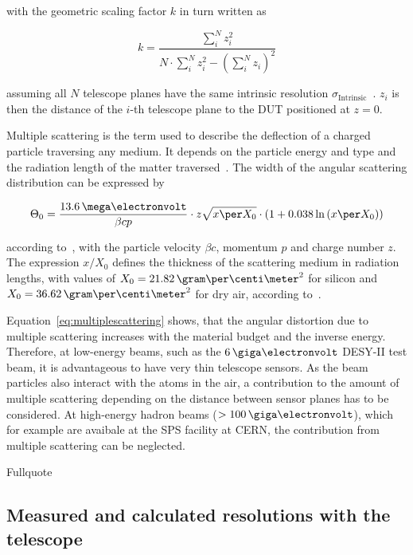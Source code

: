 with the geometric scaling factor $k$ in turn written as

\begin{equation}
k = \frac{\sum_i^N z_i^2}{N \cdot \sum_i^N z_i^2 - \left( \sum_i^N z_i
\right)^2}
\end{equation}

assuming all $N$ telescope planes have the same intrinsic resolution
$\sigma_{\textrm{Intrinsic}}$~\cite{ref:eudetreport200902}. 
$z_i$ is then the distance of the $i$-th telescope plane to the DUT positioned at $z=0$.

Multiple scattering is the term used to describe the deflection of a charged particle traversing any medium. 
It depends on the particle energy and type
and the radiation length of the matter traversed~\cite{ref:scatteringhighland}.
The width of the angular scattering distribution can be expressed by

\begin{equation}
\label{eq:multiplescattering}
\Theta_{0} = \frac{13.6\,\mega\electronvolt}{\beta c p} \cdot z
\sqrt{x \per X_0}
\cdot \left( 1 + 0.038 \ln{\left( x \per X_0\right) } \right)
\end{equation}

according to~\cite{ref:PDG-2014}, with the particle velocity $\beta c$, momentum $p$ and charge number $z$. 
The expression $x/X_0$ defines the thickness of the
scattering medium in radiation lengths, with values of $X_0 =
21.82\,\allowbreak\gram\per\centi\meter^2$ for silicon and $X_0 =
36.62\,\gram\per\centi\meter^2$ for dry air, according to~\cite{ref:x0values}.

Equation~\ref{eq:multiplescattering} shows, that the angular distortion due to
multiple scattering increases with the material budget and the inverse energy.
Therefore, at low-energy beams, such as the $6\,\giga\electronvolt$ DESY-II test
beam, it is advantageous to have very thin telescope sensors. 
As the beam particles also interact with the atoms in the air, a contribution to the amount
of multiple scattering depending on the distance between sensor planes has to be
considered. 
At high-energy hadron beams ($> 100\,\giga\electronvolt$), which for
example are avaibale at the SPS facility at CERN, the contribution from multiple
scattering can be neglected.





Fullquote~\cite{ref:thomas}
\bigskip


\subsection{Measured and calculated resolutions with the \Datura telescope}
\label{sec:telescoperesolution}

